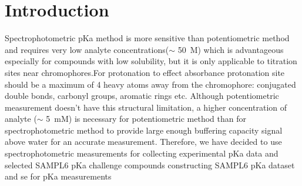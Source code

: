 \documentclass[9pt,lineno]{elife}
\begin{document}
\section{Introduction}





Spectrophotometric pKa method is more sensitive than potentiometric method and requires very low analyte concentrations($\sim$ 50~\micro M) which is advantageous especially for compounds with low solubility, but it is only applicable to titration sites near chromophores.For protonation to effect absorbance protonation site should be a maximum of 4 heavy atoms away from the chromophore: conjugated double bonds, carbonyl groups, aromatic rings etc.
Although potentiometric measurement doesn't have this structural limitation, a higher concentration of analyte ($\sim$ 5~mM) is necessary for potentiometric method than for spectrophotometric method to provide large enough buffering capacity signal above water for an accurate measurement. Therefore, we have decided to use spectrophotometric measurements for collecting experimental pKa data and selected SAMPL6 pKa challenge compounds constructing SAMPL6 pKa dataset and se for pKa measurements
\end{document}
